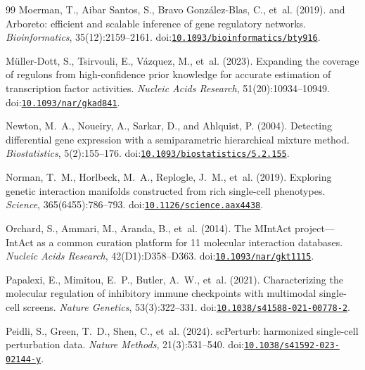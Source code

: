 \documentclass[11pt,a4paper]{article}
\begin{document}
\begin{thebibliography}{99}
Moerman, T., Aibar Santos, S., Bravo Gonz{\'a}lez-Blas, C., et~al. (2019).
 and {Arboreto}: efficient and scalable inference of gene regulatory networks.
\newblock \emph{Bioinformatics}, 35(12):2159--2161.
\newblock doi:\href{https://doi.org/10.1093/bioinformatics/bty916}{\nolinkurl{10.1093/bioinformatics/bty916}}.

M{\"u}ller-Dott, S., Tsirvouli, E., V{\'a}zquez, M., et~al. (2023).
\newblock Expanding the coverage of regulons from high-confidence prior knowledge for accurate estimation of transcription factor activities.
\newblock \emph{Nucleic Acids Research}, 51(20):10934--10949.
\newblock doi:\href{https://doi.org/10.1093/nar/gkad841}{\nolinkurl{10.1093/nar/gkad841}}.

Newton, M.~A., Noueiry, A., Sarkar, D., and Ahlquist, P. (2004).
\newblock Detecting differential gene expression with a semiparametric hierarchical mixture method.
\newblock \emph{Biostatistics}, 5(2):155--176.
\newblock doi:\href{https://doi.org/10.1093/biostatistics/5.2.155}{\nolinkurl{10.1093/biostatistics/5.2.155}}.

Norman, T.~M., Horlbeck, M.~A., Replogle, J.~M., et~al. (2019).
\newblock Exploring genetic interaction manifolds constructed from rich single-cell phenotypes.
\newblock \emph{Science}, 365(6455):786--793.
\newblock doi:\href{https://doi.org/10.1126/science.aax4438}{\nolinkurl{10.1126/science.aax4438}}.

Orchard, S., Ammari, M., Aranda, B., et~al. (2014).
\newblock The MIntAct project---IntAct as a common curation platform for 11 molecular interaction databases.
\newblock \emph{Nucleic Acids Research}, 42(D1):D358--D363.
\newblock doi:\href{https://doi.org/10.1093/nar/gkt1115}{\nolinkurl{10.1093/nar/gkt1115}}.

Papalexi, E., Mimitou, E.~P., Butler, A.~W., et~al. (2021).
\newblock Characterizing the molecular regulation of inhibitory immune checkpoints with multimodal single-cell screens.
\newblock \emph{Nature Genetics}, 53(3):322--331.
\newblock doi:\href{https://doi.org/10.1038/s41588-021-00778-2}{\nolinkurl{10.1038/s41588-021-00778-2}}.

Peidli, S., Green, T.~D., Shen, C., et~al. (2024).
\newblock sc{P}erturb: harmonized single-cell perturbation data.
\newblock \emph{Nature Methods}, 21(3):531--540.
\newblock doi:\href{https://doi.org/10.1038/s41592-023-02144-y}{\nolinkurl{10.1038/s41592-023-02144-y}}.


\end{thebibliography}
\end{document}
